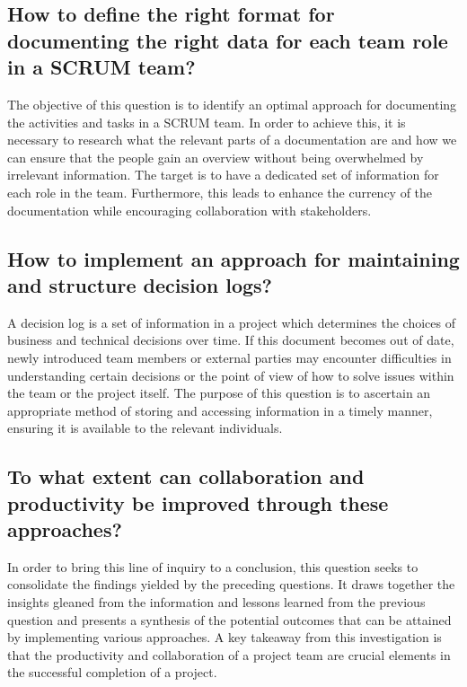 \subsection*{How to define the right format for documenting the right data for each team role in a \ac{SCRUM} team?}
The objective of this question is to identify an optimal approach for documenting the activities and tasks in a \ac{SCRUM} team. In order to achieve this, it is necessary to research what the relevant parts of a documentation are and how we can ensure that the people gain an overview without being overwhelmed by irrelevant information. The target is to have a dedicated set of information for each role in the team. Furthermore, this leads to enhance the currency of the documentation while encouraging collaboration with stakeholders.

\subsection*{How to implement an approach for maintaining and structure decision logs?}
A decision log is a set of information in a project which determines the choices of business and technical decisions over time. If this document becomes out of date, newly introduced team members or external parties may encounter difficulties in understanding certain decisions or the point of view of how to solve issues within the team or the project itself. The purpose of this question is to ascertain an appropriate method of storing and accessing information in a timely manner, ensuring it is available to the relevant individuals.

\subsection*{To what extent can collaboration and productivity be improved through these approaches?}
In order to bring this line of inquiry to a conclusion, this question seeks to consolidate the findings yielded by the preceding questions. It draws together the insights gleaned from the information and lessons learned from the previous question and presents a synthesis of the potential outcomes that can be attained by implementing various approaches.
A key takeaway from this investigation is that the productivity and collaboration of a project team are crucial elements in the successful completion of a project.



